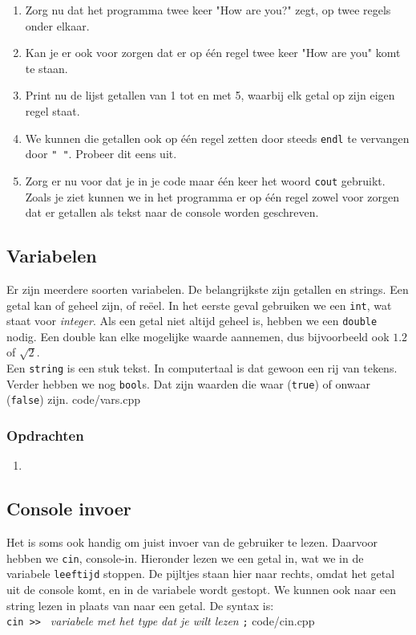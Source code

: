 \documentclass[12pt,a4paper]{article}
\newcommand{\code}{}
\newcommand{\icode}{\lstinline}
\begin{document}
\begin{enumerate}
		\item
			Zorg nu dat het programma twee keer "How are you?" zegt, op twee regels onder elkaar.
		\item
			Kan je er ook voor zorgen dat er op \'e\'en regel twee keer "How are you" komt te staan.
		\item
			Print nu de lijst getallen van 1 tot en met 5, waarbij elk getal op zijn eigen regel staat.
		\item
			We kunnen die getallen ook op \'e\'en regel zetten door steeds \icode{endl} te vervangen door \icode{" "}. Probeer dit eens uit.
		\item
			Zorg er nu voor dat je in je code maar \'e\'en keer het woord \icode{cout} gebruikt.
			Zoals je ziet kunnen we in het programma er op \'e\'en regel zowel voor zorgen dat er getallen als tekst naar de console worden geschreven. 
\end{enumerate}

\subsection{Variabelen}
Er zijn meerdere soorten variabelen. De belangrijkste zijn getallen en strings. Een getal kan of geheel zijn, of re\"eel. In het eerste geval gebruiken we een \icode{int}, wat staat voor \emph{integer}. Als een getal niet altijd geheel is, hebben we een \icode{double} nodig. Een double kan elke mogelijke waarde aannemen, dus bijvoorbeeld ook $1.2$ of $\sqrt 2$.\\
Een \icode{string} is een stuk tekst. In computertaal is dat gewoon een rij van tekens. Verder hebben we nog \icode{bool}s. Dat zijn waarden die waar (\icode{true}) of onwaar (\icode{false}) zijn.
\code{code/vars.cpp}
\subsubsection{Opdrachten}
\begin{enumerate}
		\item
\end{enumerate}


\subsection{Console invoer}
Het is soms ook handig om juist invoer van de gebruiker te lezen. Daarvoor hebben we \icode{cin}, console-in. Hieronder lezen we een getal in, wat we in de variabele \icode{leeftijd} stoppen. De pijltjes staan hier naar rechts, omdat het getal uit de console komt, en in de variabele wordt gestopt. We kunnen ook naar een string lezen in plaats van naar een getal. De syntax is: \\
\icode{cin >> } \emph{variabele met het type dat je wilt lezen} \icode{;}
\code{code/cin.cpp}
\end{document}
